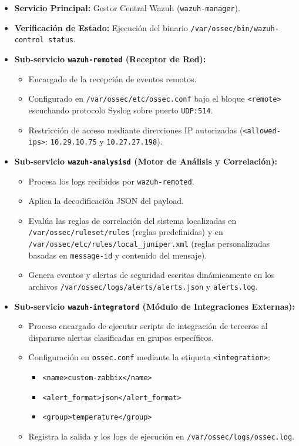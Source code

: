 \begin{itemize}
    \item \textbf{Servicio Principal:} Gestor Central Wazuh (\texttt{wazuh-manager}).
    \item \textbf{Verificación de Estado:} Ejecución del binario \texttt{/var/ossec/bin/wazuh-control status}.
    \item \textbf{Sub-servicio \texttt{wazuh-remoted} (Receptor de Red):}
    \begin{itemize}
        \item Encargado de la recepción de eventos remotos.
        \item Configurado en \texttt{/var/ossec/etc/ossec.conf} bajo el bloque \texttt{<remote>} escuchando protocolo Syslog sobre puerto \texttt{UDP:514}.
        \item Restricción de acceso mediante direcciones IP autorizadas (\texttt{<allowed-ips>}: \texttt{10.29.10.75} y \texttt{10.27.27.198}).
    \end{itemize}
    \item \textbf{Sub-servicio \texttt{wazuh-analysisd} (Motor de Análisis y Correlación):}
    \begin{itemize}
        \item Procesa los logs recibidos por \texttt{wazuh-remoted}.
        \item Aplica la decodificación JSON del payload.
        \item Evalúa las reglas de correlación del sistema localizadas en \texttt{/var/ossec/ruleset/rules} (reglas predefinidas) y en \texttt{/var/ossec/etc/rules/local\_juniper.xml} (reglas personalizadas basadas en \texttt{message-id} y contenido del mensaje).
        \item Genera eventos y alertas de seguridad escritas dinámicamente en los archivos \texttt{/var/ossec/logs/alerts/alerts.json} y \texttt{alerts.log}.
    \end{itemize}
    \item \textbf{Sub-servicio \texttt{wazuh-integratord} (Módulo de Integraciones Externas):}
    \begin{itemize}
        \item Proceso encargado de ejecutar scripts de integración de terceros al dispararse alertas clasificadas en grupos específicos.
        \item Configuración en \texttt{ossec.conf} mediante la etiqueta \texttt{<integration>}:
        \begin{itemize}
            \item \texttt{<name>custom-zabbix</name>}
            \item \texttt{<alert\_format>json</alert\_format>}
            \item \texttt{<group>temperature</group>}
        \end{itemize}
        \item Registra la salida y los logs de ejecución en \texttt{/var/ossec/logs/ossec.log}.
    \end{itemize}
\end{itemize}

